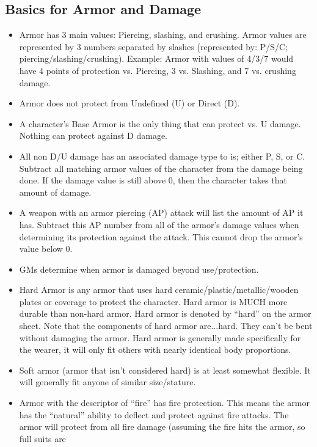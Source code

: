 \subsection{Basics for Armor and Damage}

\begin{itemize}
\item Armor has 3 main values: Piercing, slashing, and crushing.  
  Armor values are represented by 3 numbers separated by slashes 
  (represented by:  P/S/C; piercing/slashing/crushing).  Example: Armor 
  with values of 4/3/7 would have 4 points of protection vs. Piercing, 
  3 vs. Slashing, and 7 vs. crushing damage.
\item Armor does not protect from Undefined (U) or Direct (D).
\item A character's Base Armor is the only thing that can protect vs. 
  U damage.  Nothing can protect against D damage.
\item All non D/U damage has an associated damage type to is; either P, 
  S, or C.  Subtract all matching armor values of the character from 
  the damage being done.  If the damage value is still above 0, then 
  the character takes that amount of damage.
\item A weapon with an armor piercing (AP) attack will list the amount 
  of AP it has.  Subtract this AP number from all of the armor's 
  damage values when determining its protection against the attack.  
  This cannot drop the armor's value below 0.
\item GMs determine when armor is damaged beyond use/protection.
\item Hard Armor is any armor that uses hard 
  ceramic/plastic/metallic/wooden plates or coverage to protect 
  the character.  Hard armor is MUCH more durable than non-hard armor.  
  Hard armor is denoted by ``hard'' on the armor sheet.  Note that 
  the components of hard armor are$\ldots$hard.  They can't be bent 
  without damaging the armor.  Hard armor is generally made specifically 
  for the wearer, it will only fit others with nearly identical 
  body proportions.
\item Soft armor (armor that isn't considered hard) is at least 
  somewhat flexible.  It will generally fit anyone of similar size/stature. 
\item Armor with the descriptor of ``fire'' has fire protection.  
  This means the armor has the ``natural'' ability to deflect 
  and protect against fire attacks.  The armor will protect from all 
  fire damage (assuming the fire hits the armor, so full suits are 

\end{itemize}
